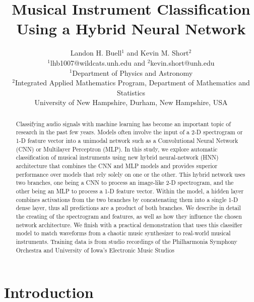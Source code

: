 \documentclass[conference,onecolumn,letterpaper]{IEEEtran}
\title{Musical Instrument Classification Using a Hybrid Neural Network}
\author{Landon H. Buell$^1$ and Kevin M. Short$^2$\\
        $^1$lhb1007@wildcats.unh.edu and 				$^2$kevin.short@unh.edu\\
        $^1$Department of Physics and Astronomy\\
        $^2$Integrated Applied Mathematics Program, Department of Mathematics and Statistics\\
        University of New Hampshire, Durham, New Hampshire, USA\\
       }
\begin{document}
\maketitle


\begin{abstract}
    Classifying audio signals with machine learning has become an important topic of research in the past few years. Models often involve the input of a 2-D spectrogram or 1-D feature vector into a unimodal network such as a Convolutional Neural Network (CNN) or Multilayer Perceptron (MLP). In this study, we explore automatic classification of musical instruments using new hybrid neural-network (HNN)  architecture that combines the CNN and MLP models and provides superior performance over models that rely solely on one or the other. This hybrid network uses two branches, one being a CNN to process an image-like 2-D spectrogram, and the other being an MLP to process a 1-D feature vector. Within the model, a hidden layer combines activations from the two branches by concatenating them into a single 1-D dense layer, thus all predictions are a product of both branches. We describe in detail the creating of the spectrogram and features, as well as how they influence the chosen network architecture. We finish with a practical demonstration that uses this classifier model to match waveforms from a chaotic music synthesizer to real-world musical instruments. Training data is from studio recordings of the Philharmonia Symphony Orchestra and University of Iowa's Electronic Music Studios
\end{abstract}


\section{Introduction}
\label{sec:Intro}

\end{document}
